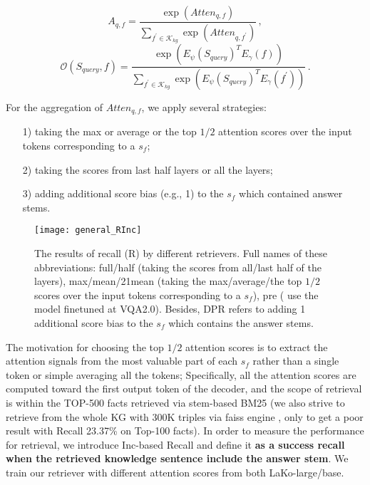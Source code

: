\documentclass[sigconf]{acmart}
\newcommand{\cjy}[1]{{\color{black}#1}}
\begin{document}
\begin{equation}
    {A}_{q, f}=\frac{\exp \left(Atten_{q, f}\right)}{\sum_{f^{\prime} \in \mathcal{K}_{kg}} \exp \left(Atten_{q, f^{\prime}}\right)}\,,
\end{equation}
\begin{equation}
\mathcal{O}(S_{query}, f)=\frac{\exp \left(E_{\psi}(S_{query})^{T} E_{\gamma}(f)\right)}{\sum_{f^{\prime} \in \mathcal{K}_{kg}} \exp \left(E_{\psi}(S_{query})^{T} E_{\gamma}(f^{\prime})\right)}\,.
\end{equation}

For the aggregation of $Atten_{q, f}$, we apply several strategies: 

\begin{enumerate}

\item [1)] taking the max or average or the top $1/2$ attention scores over the input tokens corresponding to a $s_f$; 
\item [2)] taking the scores from last half layers or all the layers;
\item [3)] \cjy{adding} additional score bias (e.g., 1) to the $s_f$ which contained answer stems.

\end{enumerate}

\begin{figure}[htbp]
  \texttt{[image: general\_RInc]}
  \vspace{-1mm}
    \caption{The results of recall \cjy{(R) by different retrievers.}
Full names of these abbreviations: 
    full/half (taking the scores from all/last half of the layers), max/mean/21mean (taking the max/average/the top $1/2$ scores over the input tokens corresponding to a $s_f$), pre ( use the model finetuned at VQA2.0). Besides, DPR \citep{DBLP:conf/emnlp/KarpukhinOMLWEC20} refers to adding 1 additional score bias to the $s_f$ which contains the answer stems.
    } 
  \vspace{-2mm}
  \label{fig:inc}
\end{figure}

The motivation for choosing the top $1/2$ attention scores is to extract the attention signals from the most valuable part of each $s_f$ rather than a single token or simple averaging all the tokens;
Specifically, all the attention scores are computed toward \cjy{the} first output token of the decoder, and the scope of retrieval is within the TOP-500 fact\cjy{s} retrieved via stem-based BM25 (we also strive to retrieve from the whole KG with 300K triples via faiss engine \cite{johnson2019billion}, only to get a poor result with Recall 23.37\% on Top-100 facts). 
In order to measure the performance for retrieval, we introduce Inc-based Recall and define it \textbf{as a success recall when the retrieved knowledge sentence include the answer stem}. 
We train our retriever with different attention scores from both LaKo-large/base.
\end{document}
